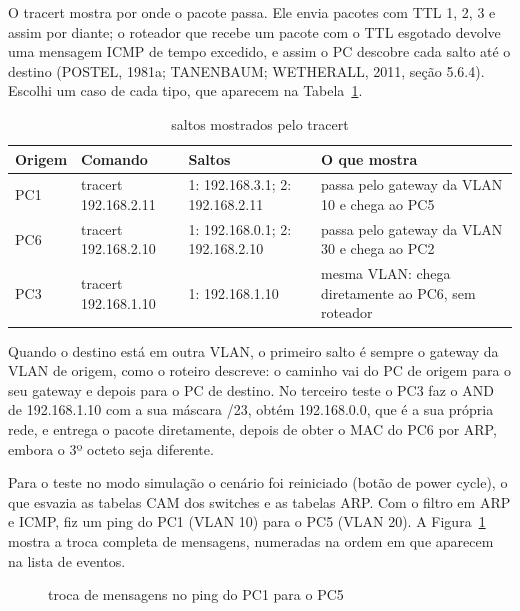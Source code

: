 
O tracert mostra por onde o pacote passa. Ele envia pacotes com TTL 1, 2, 3 e assim por diante; o roteador que recebe um pacote com o TTL esgotado devolve uma mensagem ICMP de tempo excedido, e assim o PC descobre cada salto até o destino (POSTEL, 1981a; TANENBAUM; WETHERALL, 2011, seção 5.6.4). Escolhi um caso de cada tipo, que aparecem na Tabela~\ref{tab:tracert}.

\begin{table}[H]
\caption{saltos mostrados pelo tracert}\label{tab:tracert}
\footnotesize\renewcommand{\arraystretch}{1.2}
\begin{tabularx}{\textwidth}{@{}lll>{\raggedright\arraybackslash}X@{}}
\toprule
\textbf{Origem} & \textbf{Comando} & \textbf{Saltos} & \textbf{O que mostra}\\
\midrule
PC1 & tracert 192.168.2.11 & 1: 192.168.3.1; 2: 192.168.2.11 & passa pelo gateway da VLAN 10 e chega ao PC5\\
PC6 & tracert 192.168.2.10 & 1: 192.168.0.1; 2: 192.168.2.10 & passa pelo gateway da VLAN 30 e chega ao PC2\\
PC3 & tracert 192.168.1.10 & 1: 192.168.1.10 & mesma VLAN: chega diretamente ao PC6, sem roteador\\
\bottomrule
\end{tabularx}
\fonte
\end{table}

Quando o destino está em outra VLAN, o primeiro salto é sempre o gateway da VLAN de origem, como o roteiro descreve: o caminho vai do PC de origem para o seu gateway e depois para o PC de destino. No terceiro teste o PC3 faz o AND de 192.168.1.10 com a sua máscara /23, obtém 192.168.0.0, que é a sua própria rede, e entrega o pacote diretamente, depois de obter o MAC do PC6 por ARP, embora o 3º octeto seja diferente.


Para o teste no modo simulação o cenário foi reiniciado (botão de power cycle), o que esvazia as tabelas CAM dos switches e as tabelas ARP. Com o filtro em ARP e ICMP, fiz um ping do PC1 (VLAN 10) para o PC5 (VLAN 20). A Figura~\ref{fig:sequencia} mostra a troca completa de mensagens, numeradas na ordem em que aparecem na lista de eventos.

\begin{figure}[tbp]
\captionsetup{position=top}
\caption{troca de mensagens no ping do PC1 para o PC5}\label{fig:sequencia}
\centering
\resizebox{\textwidth}{!}{}
\fonte
\end{figure}

